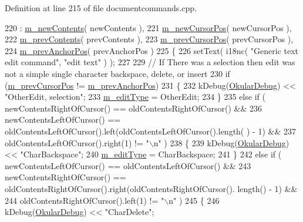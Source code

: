 Definition at line 215 of file documentcommands.\+cpp.


\begin{DoxyCode}
220  : \hyperlink{classOkular_1_1EditTextCommand_acad269fa8b4b5249bf15435b302d9fb2}{m\_newContents}( newContents ),
221    \hyperlink{classOkular_1_1EditTextCommand_abe7c2c72e0caeffbd4c5abfd7e375548}{m\_newCursorPos}( newCursorPos ),
222    \hyperlink{classOkular_1_1EditTextCommand_a461d065fa44222a7c94a23ce2df39188}{m\_prevContents}( prevContents ),
223    \hyperlink{classOkular_1_1EditTextCommand_a5bc4e5af11ce42281c590750e0c75b51}{m\_prevCursorPos}( prevCursorPos ),
224    \hyperlink{classOkular_1_1EditTextCommand_afe5d2bc5003ae94ec364eeabd5789e64}{m\_prevAnchorPos}( prevAnchorPos )
225 \{
226     setText( i18nc( \textcolor{stringliteral}{"Generic text edit command"}, \textcolor{stringliteral}{"edit text"} ) );
227 
229     \textcolor{comment}{// If There was a selection then edit was not a simple single character backspace, delete, or insert}
230     \textcolor{keywordflow}{if} (\hyperlink{classOkular_1_1EditTextCommand_a5bc4e5af11ce42281c590750e0c75b51}{m\_prevCursorPos} != \hyperlink{classOkular_1_1EditTextCommand_afe5d2bc5003ae94ec364eeabd5789e64}{m\_prevAnchorPos})
231     \{
232         kDebug(\hyperlink{debug__p_8h_af16c6e32a95969dd0605d792ec9807c7}{OkularDebug}) << \textcolor{stringliteral}{"OtherEdit, selection"};
233         \hyperlink{classOkular_1_1EditTextCommand_a42cda0a7ce0ba481e7061daebb610a7b}{m\_editType} = OtherEdit;
234     \}
235     \textcolor{keywordflow}{else} \textcolor{keywordflow}{if} ( newContentsRightOfCursor() == oldContentsRightOfCursor() &&
236               newContentsLeftOfCursor() == oldContentsLeftOfCursor().left(oldContentsLeftOfCursor().length(
      ) - 1) &&
237               oldContentsLeftOfCursor().right(1) != \textcolor{stringliteral}{"\(\backslash\)n"} )
238     \{
239         kDebug(\hyperlink{debug__p_8h_af16c6e32a95969dd0605d792ec9807c7}{OkularDebug}) << \textcolor{stringliteral}{"CharBackspace"};
240         \hyperlink{classOkular_1_1EditTextCommand_a42cda0a7ce0ba481e7061daebb610a7b}{m\_editType} = CharBackspace;
241     \}
242     \textcolor{keywordflow}{else} \textcolor{keywordflow}{if} ( newContentsLeftOfCursor() == oldContentsLeftOfCursor() &&
243               newContentsRightOfCursor() == oldContentsRightOfCursor().right(oldContentsRightOfCursor().
      length() - 1) &&
244               oldContentsRightOfCursor().left(1) != \textcolor{stringliteral}{"\(\backslash\)n"} )
245     \{
246         kDebug(\hyperlink{debug__p_8h_af16c6e32a95969dd0605d792ec9807c7}{OkularDebug}) << \textcolor{stringliteral}{"CharDelete"};

\end{DoxyCode}

